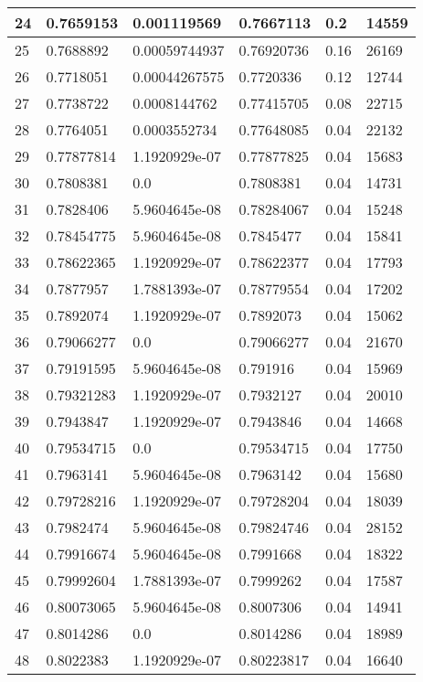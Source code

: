 \begin{longtable}{|l|l|l|l|l|l|}
24 & 0.7659153 & 0.001119569 & 0.7667113 & 0.2 & 14559 \\ \hline 
25 & 0.7688892 & 0.00059744937 & 0.76920736 & 0.16 & 26169 \\ \hline 
26 & 0.7718051 & 0.00044267575 & 0.7720336 & 0.12 & 12744 \\ \hline 
27 & 0.7738722 & 0.0008144762 & 0.77415705 & 0.08 & 22715 \\ \hline 
28 & 0.7764051 & 0.0003552734 & 0.77648085 & 0.04 & 22132 \\ \hline 
29 & 0.77877814 & 1.1920929e-07 & 0.77877825 & 0.04 & 15683 \\ \hline 
30 & 0.7808381 & 0.0 & 0.7808381 & 0.04 & 14731 \\ \hline 
31 & 0.7828406 & 5.9604645e-08 & 0.78284067 & 0.04 & 15248 \\ \hline 
32 & 0.78454775 & 5.9604645e-08 & 0.7845477 & 0.04 & 15841 \\ \hline 
33 & 0.78622365 & 1.1920929e-07 & 0.78622377 & 0.04 & 17793 \\ \hline 
34 & 0.7877957 & 1.7881393e-07 & 0.78779554 & 0.04 & 17202 \\ \hline 
35 & 0.7892074 & 1.1920929e-07 & 0.7892073 & 0.04 & 15062 \\ \hline 
36 & 0.79066277 & 0.0 & 0.79066277 & 0.04 & 21670 \\ \hline 
37 & 0.79191595 & 5.9604645e-08 & 0.791916 & 0.04 & 15969 \\ \hline 
38 & 0.79321283 & 1.1920929e-07 & 0.7932127 & 0.04 & 20010 \\ \hline 
39 & 0.7943847 & 1.1920929e-07 & 0.7943846 & 0.04 & 14668 \\ \hline 
40 & 0.79534715 & 0.0 & 0.79534715 & 0.04 & 17750 \\ \hline 
41 & 0.7963141 & 5.9604645e-08 & 0.7963142 & 0.04 & 15680 \\ \hline 
42 & 0.79728216 & 1.1920929e-07 & 0.79728204 & 0.04 & 18039 \\ \hline 
43 & 0.7982474 & 5.9604645e-08 & 0.79824746 & 0.04 & 28152 \\ \hline 
44 & 0.79916674 & 5.9604645e-08 & 0.7991668 & 0.04 & 18322 \\ \hline 
45 & 0.79992604 & 1.7881393e-07 & 0.7999262 & 0.04 & 17587 \\ \hline 
46 & 0.80073065 & 5.9604645e-08 & 0.8007306 & 0.04 & 14941 \\ \hline 
47 & 0.8014286 & 0.0 & 0.8014286 & 0.04 & 18989 \\ \hline 
48 & 0.8022383 & 1.1920929e-07 & 0.80223817 & 0.04 & 16640 \\ \hline 

\end{longtable}
